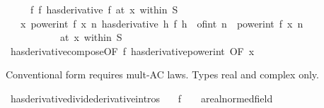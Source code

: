 \begin{isabellebody}
\ \ \ \ \ f{\isacharcolon}{\kern0pt}\ {\isachardoublequoteopen}{\isacharparenleft}{\kern0pt}f\ has{\isacharunderscore}{\kern0pt}derivative\ f{\isacharprime}{\kern0pt}{\isacharparenright}{\kern0pt}\ {\isacharparenleft}{\kern0pt}at\ x\ within\ S{\isacharparenright}{\kern0pt}{\isachardoublequoteclose}\isanewline
\ \ \ {\isachardoublequoteopen}{\isacharparenleft}{\kern0pt}{\isacharparenleft}{\kern0pt}{\isasymlambda}x{\isachardot}{\kern0pt}\ power{\isacharunderscore}{\kern0pt}int\ {\isacharparenleft}{\kern0pt}f\ x{\isacharparenright}{\kern0pt}\ n{\isacharparenright}{\kern0pt}\ has{\isacharunderscore}{\kern0pt}derivative\ {\isacharparenleft}{\kern0pt}{\isasymlambda}h{\isachardot}{\kern0pt}\ f{\isacharprime}{\kern0pt}\ h\ {\isacharasterisk}{\kern0pt}\ {\isacharparenleft}{\kern0pt}of{\isacharunderscore}{\kern0pt}int\ n\ {\isacharasterisk}{\kern0pt}\ power{\isacharunderscore}{\kern0pt}int\ {\isacharparenleft}{\kern0pt}f\ x{\isacharparenright}{\kern0pt}\ {\isacharparenleft}{\kern0pt}n\ {\isacharminus}{\kern0pt}\ {}{\isacharparenright}{\kern0pt}{\isacharparenright}{\kern0pt}{\isacharparenright}{\kern0pt}{\isacharparenright}{\kern0pt}\isanewline
\ \ \ \ \ \ \ \ \ \ \ {\isacharparenleft}{\kern0pt}at\ x\ within\ S{\isacharparenright}{\kern0pt}{\isachardoublequoteclose}\isanewline
%
\isadelimproof
\ \ %
\endisadelimproof
%
\isatagproof
{}\isamarkupfalse%
\ has{\isacharunderscore}{\kern0pt}derivative{\isacharunderscore}{\kern0pt}compose{\isacharbrackleft}{\kern0pt}OF\ f\ has{\isacharunderscore}{\kern0pt}derivative{\isacharunderscore}{\kern0pt}power{\isacharunderscore}{\kern0pt}int{\isacharprime}{\kern0pt}{\isacharcomma}{\kern0pt}\ OF\ x{\isacharbrackright}{\kern0pt}\ \isacommand{{\isachardot}{\kern0pt}}\isamarkupfalse%
%
\endisatagproof
{\isafoldproof}%
%
\isadelimproof
%
\endisadelimproof
%
\begin{isamarkuptext}%
Conventional form requires mult-AC laws. Types real and complex only.%
\end{isamarkuptext}\isamarkuptrue%
\isamarkupfalse%
\ has{\isacharunderscore}{\kern0pt}derivative{\isacharunderscore}{\kern0pt}divide{\isacharprime}{\kern0pt}{\isacharbrackleft}{\kern0pt}derivative{\isacharunderscore}{\kern0pt}intros{\isacharbrackright}{\kern0pt}{\isacharcolon}{\kern0pt}\isanewline
\ \ \ f\ {\isacharcolon}{\kern0pt}{\isacharcolon}{\kern0pt}\ {\isachardoublequoteopen}{\isacharunderscore}{\kern0pt}\ {\isasymRightarrow}\ {\isacharprime}{\kern0pt}a{\isacharcolon}{\kern0pt}{\isacharcolon}{\kern0pt}real{\isacharunderscore}{\kern0pt}normed{\isacharunderscore}{\kern0pt}field{\isachardoublequoteclose}\isanewline

\end{isabellebody}
